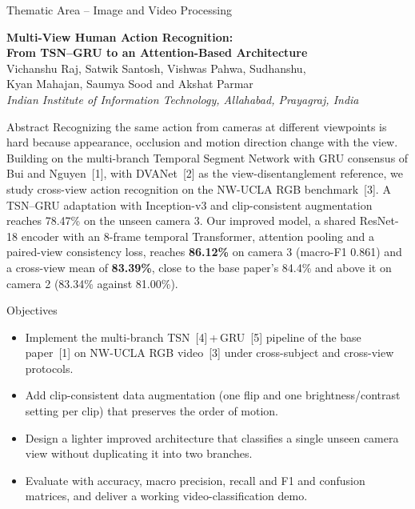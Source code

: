 \documentclass{article}
\begin{document}
{\fontsize{26}{30}\selectfont\color{hdrL}\hfill Thematic Area -- Image and Video Processing\hfill{}}\\[3mm]
\begin{center}
{\fontsize{62}{71}\selectfont\bfseries\color{titleblue}Multi-View Human Action Recognition:\\[2mm]
From TSN--GRU to an Attention-Based Architecture}\\[5mm]
{\fontsize{29}{35}\selectfont\color{black}Vichanshu Raj, Satwik Santosh, Vishwas Pahwa, Sudhanshu,\\[1mm]
Kyan Mahajan, Saumya Sood and Akshat Parmar}\\[4mm]
{\fontsize{25}{30}\selectfont\itshape\color{black}Indian Institute of Information Technology, Allahabad, Prayagraj, India}
\end{center}
\vspace{-2mm}

\begin{tcbraster}[raster columns=2,raster equal height=rows,raster column skip=8mm,raster after skip=4mm]
\begin{psec}[after skip=0pt]{Abstract}
Recognizing the same action from cameras at different viewpoints is hard because appearance, occlusion and motion direction change with the view. Building on the multi-branch Temporal Segment Network with GRU consensus of Bui and Nguyen~[1], with DVANet~[2] as the view-disentanglement reference, we study cross-view action recognition on the NW-UCLA RGB benchmark~[3]. A TSN--GRU adaptation with Inception-v3 and clip-consistent augmentation reaches 78.47\% on the unseen camera 3. Our improved model, a shared ResNet-18 encoder with an 8-frame temporal Transformer, attention pooling and a paired-view consistency loss, reaches \textbf{86.12\%} on camera 3 (macro-F1 0.861) and a cross-view mean of \textbf{83.39\%}, close to the base paper's 84.4\% and above it on camera 2 (83.34\% against 81.00\%).
\end{psec}
\begin{psec}[after skip=0pt]{Objectives}
\begin{itemize}
\item Implement the multi-branch TSN~[4]\,+\,GRU~[5] pipeline of the base paper~[1] on NW-UCLA RGB video~[3] under cross-subject and cross-view protocols.
\item Add clip-consistent data augmentation (one flip and one brightness/contrast setting per clip) that preserves the order of motion.
\item Design a lighter improved architecture that classifies a single unseen camera view without duplicating it into two branches.
\item Evaluate with accuracy, macro precision, recall and F1 and confusion matrices, and deliver a working video-classification demo.
\end{itemize}
\end{psec}
\end{tcbraster}
\end{document}
